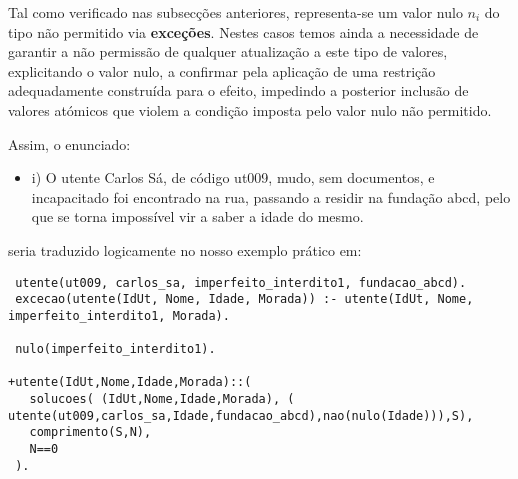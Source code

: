 \documentclass[
  oneside,
  10pt, a4paper,
  footinclude=true,
  headinclude=true,
  cleardoublepage=empty
]{scrbook}
\begin{document}
Tal como verificado nas subsecções anteriores, representa-se um valor nulo $n_{i}$ do tipo não permitido via \textbf{exceções}. Nestes casos temos ainda a necessidade de garantir a não permissão de qualquer atualização a este tipo de valores, explicitando o valor nulo,
a confirmar pela aplicação de uma restrição adequadamente construída para o efeito, impedindo a posterior inclusão de valores atómicos que violem a condição imposta pelo valor nulo não permitido.


Assim, o enunciado: 
\begin{itemize}
\item i) O utente Carlos Sá, de código ut009, mudo, sem documentos, e incapacitado foi encontrado na rua, passando a residir na fundação abcd, pelo que se torna impossível vir a saber a idade do mesmo.
\end{itemize}

seria traduzido logicamente  no nosso exemplo prático em:


\begin{lstlisting}
 utente(ut009, carlos_sa, imperfeito_interdito1, fundacao_abcd).
 excecao(utente(IdUt, Nome, Idade, Morada)) :- utente(IdUt, Nome, imperfeito_interdito1, Morada).
 
 nulo(imperfeito_interdito1).

+utente(IdUt,Nome,Idade,Morada)::(
   solucoes( (IdUt,Nome,Idade,Morada), ( utente(ut009,carlos_sa,Idade,fundacao_abcd),nao(nulo(Idade))),S),
   comprimento(S,N),
   N==0
 ).
 \end{lstlisting}


        
         
         
         

        
        
        
        
        
        
        
        
        
        
        
        
        
        
        
        
        
        
        
        
        
        
        
        
        
        
\end{document}
